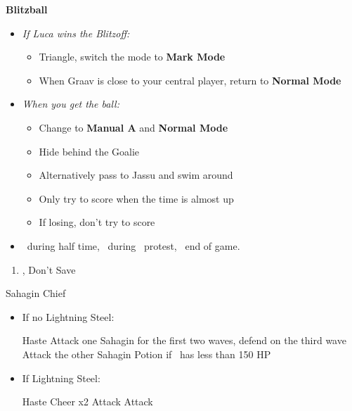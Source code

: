 \begin{trial}
  \textbf{Blitzball}
  \begin{itemize}
    \item \textit{If Luca wins the Blitzoff:}
          \begin{itemize}
            \item Triangle, switch the mode to \textbf{Mark Mode}
            \item When Graav is close to your central player, return to \textbf{Normal Mode}
          \end{itemize}
    \item \textit{When you get the ball:}
          \begin{itemize}
            \item Change to \textbf{Manual A} and \textbf{Normal Mode}
            \item Hide behind the Goalie
            \item Alternatively pass to Jassu and swim around
            \item Only try to score when the time is almost up
            \item If losing, don't try to score
          \end{itemize}
    \item \sd\ during half time, \sd\ during \wakka\ protest, \sd\ end of game.
  \end{itemize}
\end{trial}
\begin{enumerate}[resume]
  \item \cs[1:00], Don't Save
\end{enumerate}
\begin{battle}{Sahagin Chief}
  \begin{itemize}
    \item{If no Lightning Steel:}
          \begin{itemize}
            \tidusf Haste \tidus
            \wakkaf Attack one Sahagin for the first two waves, defend on the third wave
            \tidusf Attack the other Sahagin
            \wakkaf Potion if \tidus\ has less than 150 HP
          \end{itemize}
    \item{If Lightning Steel:}
          \begin{itemize}
            \tidusf Haste \tidus
            \tidusf Cheer x2
            \wakkaf Attack
            \tidusf Attack
          \end{itemize}
  \end{itemize}
\end{battle}
